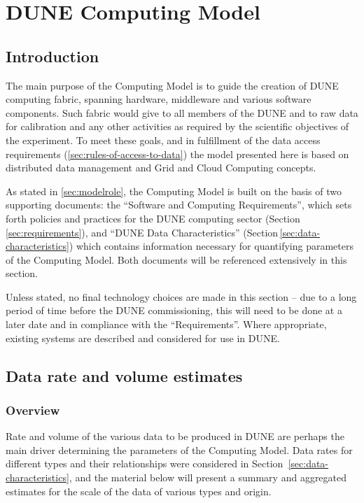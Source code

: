 \section{DUNE Computing Model}
\label{sec:computing_model}

\subsection{Introduction}
The main purpose of the Computing Model is to guide the creation of DUNE computing fabric, spanning
hardware, middleware and various software components. Such fabric would give to all members of the DUNE
and to raw data for calibration and any other activities as required by the scientific objectives of the experiment.
To meet these goals, and in fulfillment of the data access requirements (\ref{sec:rules-of-access-to-data})
the model presented here is based on distributed data management and Grid and Cloud Computing concepts.

As stated in \ref{sec:modelrole}, the Computing Model is built on the basis of two supporting documents: the
``Software and Computing Requirements'', which sets forth policies and practices for the DUNE computing sector
(Section\,\ref{sec:requirements}), and ``DUNE Data Characteristics'' (Section\,\ref{sec:data-characteristics}) which contains information
necessary for quantifying parameters of the Computing Model. Both documents will be referenced extensively in this section.

Unless stated, no final technology choices are made in this section -- due to a long period of time before the DUNE commissioning,
this will need to be done at a later date and in compliance with the ``Requirements''. Where appropriate, existing systems are described and
considered for use in DUNE.

\subsection{Data rate and volume estimates}
\label{sec:data-rate-and-volume-estimates}
\subsubsection{Overview}
Rate and volume of the various data to be produced in DUNE are perhaps the main driver determining the parameters
of the Computing Model. Data rates for different types and their relationships were considered in Section~\ref{sec:data-characteristics},
and the material below will present a summary and aggregated estimates for the scale of the data of various types
and origin.

